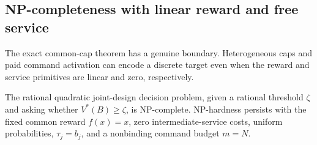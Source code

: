 \subsection{NP-completeness with linear reward and free service}\label{sec:hard54}
The exact common-cap theorem has a genuine boundary. Heterogeneous caps and paid command activation can encode a discrete target even when the reward and service primitives are linear and zero, respectively.
\begin{theorem}\label{thm:hard54}
The rational quadratic joint-design decision problem, given a rational threshold $\zeta$ and asking whether $V^*(B)\geq\zeta$, is NP-complete. NP-hardness persists with the fixed common reward $f(x)=x$, zero intermediate-service costs, uniform probabilities, $\tau_j=b_j$, and a nonbinding command budget $m=N$.
\end{theorem}
